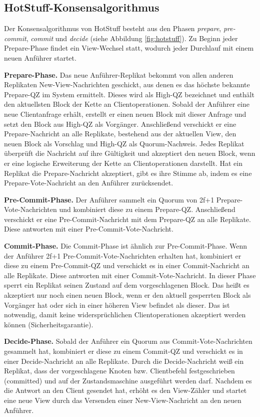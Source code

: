 \documentclass[nonacm,sigconf,natbib=false]{acmart}
\begin{document}
\subsection{HotStuff-Konsensalgorithmus}

Der Konsensalgorithmus von HotStuff besteht aus den Phasen \emph{prepare}, \emph{pre-commit}, \emph{commit} und \emph{decide} (siehe Abbildung \ref{fig:hotstuff}). Zu Beginn jeder Prepare-Phase findet ein View-Wechsel statt, wodurch jeder Durchlauf mit einem neuen Anführer startet.

\textbf{Prepare-Phase.} Das neue Anführer-Replikat bekommt von allen anderen Replikaten New-View-Nachrichten geschickt, aus denen es das höchste bekannte Prepare-QZ im System ermittelt. Dieses wird als High-QZ bezeichnet und enthält den aktuellsten Block der Kette an Clientoperationen. Sobald der Anführer eine neue Clientanfrage erhält, erstellt er einen neuen Block mit dieser Anfrage und setzt den Block aus High-QZ als Vorgänger. Anschließend verschickt er eine Prepare-Nachricht an alle Replikate, bestehend aus der aktuellen View, den neuen Block als Vorschlag und High-QZ als Quorum-Nachweis. Jedes Replikat überprüft die Nachricht auf ihre Gültigkeit und akzeptiert den neuen Block, wenn er eine logische Erweiterung der Kette an Clientoperationen darstellt. Hat ein Replikat die Prepare-Nachricht akzeptiert, gibt es ihre Stimme ab, indem es eine Prepare-Vote-Nachricht an den Anführer zurücksendet.

\textbf{Pre-Commit-Phase.} Der Anführer sammelt ein Quorum von 2f+1 Prepare-Vote-Nachrichten und kombiniert diese zu einem Prepare-QZ. Anschließend verschickt er eine Pre-Commit-Nachricht mit dem Prepare-QZ an alle Replikate. Diese antworten mit einer Pre-Commit-Vote-Nachricht.

\textbf{Commit-Phase.} Die Commit-Phase ist ähnlich zur Pre-Commit-Phase. Wenn der Anführer 2f+1 Pre-Commit-Vote-Nachrichten erhalten hat, kombiniert er diese zu einem Pre-Commit-QZ und verschickt es in einer Commit-Nachricht an alle Replikate. Diese antworten mit einer Commit-Vote-Nachricht. In dieser Phase sperrt ein Replikat seinen Zustand auf dem vorgeschlagenen Block. Das heißt es akzeptiert nur noch einen neuen Block, wenn er den aktuell gesperrten Block als Vorgänger hat oder sich in einer höheren View befindet als dieser. Das ist notwendig, damit keine widersprüchlichen Clientoperationen akzeptiert werden können (Sicherheitsgarantie).

\textbf{Decide-Phase.} Sobald der Anführer ein Quorum aus Commit-Vote-Nachrichten gesammelt hat, kombiniert er diese zu einem Commit-QZ und verschickt es in einer Decide-Nachricht an alle Replikate. Durch die Decide-Nachricht weiß ein Replikat, dass der vorgeschlagene Knoten bzw. Clientbefehl festgeschrieben (committed) und auf der Zustandsmaschine ausgeführt werden darf. Nachdem es die Antwort an den Client gesendet hat, erhöht es den View-Zähler und startet eine neue View durch das Versenden einer New-View-Nachricht an den neuen Anführer.
\end{document}
